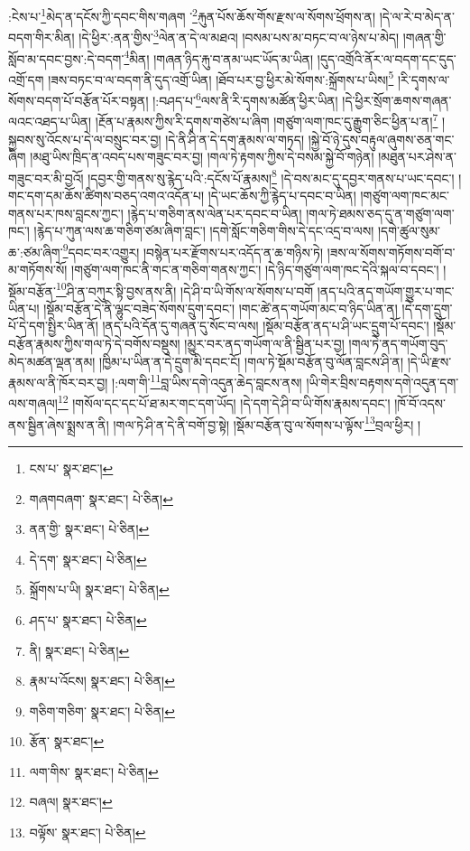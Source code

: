 :ངེས་པ་\footnote{ངས་པ་  སྣར་ཐང་། }མེད་ན་དངོས་ཀྱི་དབང་གིས་གཞག ་\footnote{གཞགབཞག་  སྣར་ཐང་།  པེ་ཅིན། }རྐུན་པོས་ཆོས་གོས་རྫས་ལ་སོགས་ཕྲོགས་ན། །དེ་ལ་རེ་བ་མེད་ན་བདག་གིར་མིན། །དེ་ཕྱིར་:ནན་གྱིས་\footnote{ནན་གྱི་  སྣར་ཐང་།  པེ་ཅིན། }ལེན་ན་དེ་ལ་མཐའ། །བསམ་པས་མ་བཏང་བ་ལ་ཉེས་པ་མེད། །གཞན་གྱི་སློབ་མ་དབང་བྱས་:དེ་བདག་\footnote{དེ་དག་  སྣར་ཐང་།  པེ་ཅིན། }མིན། །གཞན་ཉིད་རྐུ་བ་ནམ་ཡང་ཡོད་མ་ཡིན། །དུད་འགྲོའི་ནོར་ལ་བདག་དང་དུད་འགྲོ་དག །ཟས་བཏང་བ་ལ་བདག་ནི་དུད་འགྲོ་ཡིན། །ཐོབ་པར་བྱ་ཕྱིར་མེ་སོགས་:སྐྲོགས་པ་ཡིས།\footnote{སྐྲོགས་པ་ཡི།  སྣར་ཐང་།  པེ་ཅིན། } །རི་དྭགས་ལ་སོགས་བདག་པོ་བརྩོན་པོར་བསྟན། །:བཤད་པ་\footnote{ཤད་པ་  སྣར་ཐང་།  པེ་ཅིན། }ལས་ནི་རི་དྭགས་མཚོན་ཕྱིར་ཡིན། །དེ་ཕྱིར་སྲོག་ཆགས་གཞན་ལའང་འཐད་པ་ཡིན། །རྔོན་པ་རྣམས་ཀྱིས་རི་དྭགས་གཙེས་པ་ཞིག །གཙུག་ལག་ཁང་དུ་རྒྱུག་ཅིང་ཕྱིན་པ་ན།\footnote{ནི།  སྣར་ཐང་།  པེ་ཅིན། } །སྐྱབས་སུ་འོངས་པ་དེ་ལ་བསྲུང་བར་བྱ། །དེ་ནི་ཤི་ན་དེ་དག་རྣམས་ལ་གཏད། །སྐྱེ་བོ་ཉེ་དུས་བརྟུལ་ཞུགས་ཅན་གང་ཞིག །མཐུ་ཡིས་ཁྲིད་ན་འབད་པས་གཟུང་བར་བྱ། །གལ་ཏེ་རྟགས་ཀྱིས་དེ་བསམ་སྐྱེ་བོ་གཉེན། །མཐུན་པར་ཤེས་ན་གཟུང་བར་མི་བྱའོ། །དབྱར་གྱི་གནས་སུ་རྙེད་པའི་:དངོས་པོ་རྣམས།\footnote{རྣམ་པ་འོངས།  སྣར་ཐང་།  པེ་ཅིན། } །དེ་བས་མང་དུ་དབྱར་གནས་པ་ཡང་དབང་། །གང་དག་དམ་ཆོས་ཚིགས་བཅད་འགའ་འདོན་པ། །དེ་ཡང་ཆོས་ཀྱི་རྙེད་པ་དབང་བ་ཡིན། །གཙུག་ལག་ཁང་མང་གནས་པར་ཁས་བླངས་ཀྱང་། །རྙེད་པ་གཅིག་ནས་ལེན་པར་དབང་བ་ཡིན། །གལ་ཏེ་ཐམས་ཅད་དུ་ན་གཙུག་ལག་ཁང་། །རྙེད་པ་ཀུན་ལས་ཆ་གཅིག་ཙམ་ཞིག་བླང་། །དགེ་སློང་གཅིག་གིས་དེ་དང་འདྲ་བ་ལས། །དགེ་ཚུལ་སུམ་ཆ་:ཙམ་ཞིག་\footnote{གཅིག་གཅིག་  སྣར་ཐང་།  པེ་ཅིན། }དབང་བར་འགྱུར། །བསྙེན་པར་རྫོགས་པར་འདོད་ན་ཆ་གཉིས་ཏེ། །ཟས་ལ་སོགས་གཏོགས་བགོ་བ་མ་གཏོགས་སོ། །གཙུག་ལག་ཁང་ནི་གང་ན་གཅིག་གནས་ཀྱང་། །དེ་ཉིད་གཙུག་ལག་ཁང་དེའི་སྐལ་བ་དབང་། །སྡོམ་བརྩོན་\footnote{རྩོན་  སྣར་ཐང་། }ཤི་ན་བཀུར་སྟི་བྱས་ནས་ནི། །དེ་ཤི་བ་ཡི་གོས་ལ་སོགས་པ་བགོ །ནད་པའི་ནད་གཡོག་གྱུར་པ་གང་ཡིན་པ། །སྡོམ་བརྩོན་དེ་ནི་ལྷུང་བཟེད་སོགས་དྲུག་དབང་། །གང་ཚེ་ནད་གཡོག་མང་བ་ཉིད་ཡིན་ན། །དེ་དག་དྲུག་པོ་དེ་དག་སྤྱིར་ཡིན་ནོ། །ནད་པའི་དོན་དུ་གཞན་དུ་སོང་བ་ལས། །སྡོམ་བརྩོན་ནད་པ་ཤི་ཡང་དྲུག་པོ་དབང་། །སྡོམ་བརྩོན་རྣམས་ཀྱིས་གལ་ཏེ་དེ་བགོས་བསྡུས། །མྱུར་བར་ནད་གཡོག་ལ་ནི་སྦྱིན་པར་བྱ། །གལ་ཏེ་ནད་གཡོག་བུད་མེད་མཚན་ལྡན་ནམ། །ཁྱིམ་པ་ཡིན་ན་དེ་དྲུག་མི་དབང་ངོ། །གལ་ཏེ་སྡོམ་བརྩོན་བུ་ལོན་བླངས་ཤི་ན། །དེ་ཡི་རྫས་རྣམས་ལ་ནི་ཁོར་བར་བྱ། །:ལག་གི་\footnote{ལག་གིས་  སྣར་ཐང་།  པེ་ཅིན། }བླ་ཡིས་དགེ་འདུན་ཆེད་བླངས་ནས། །ཡི་གེར་བྲིས་བརྟགས་དགེ་འདུན་དག་ལས་གཞལ།\footnote{བཞལ།  སྣར་ཐང་། } །གསོལ་དང་དང་པོ་ཐ་མར་གང་དག་ཡོད། །དེ་དག་དེ་ཤི་བ་ཡི་གོས་རྣམས་དབང་། །ཁོ་བོ་འདས་ནས་སྦྱིན་ཞེས་སྨྲས་ན་ནི། །གལ་ཏེ་ཤི་ན་དེ་ནི་བགོ་བྱ་སྟེ། །སྡོམ་བརྩོན་བུ་ལ་སོགས་པ་ལྟོས་\footnote{བལྟོས་  སྣར་ཐང་།  པེ་ཅིན། }བྲལ་ཕྱིར། །

